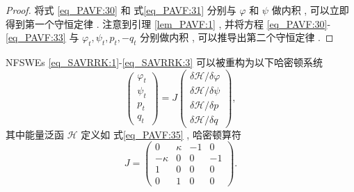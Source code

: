 \begin{proof}
将式 \eqref{eq_PAVF:30} 和 式\eqref{eq_PAVF:31} 分别与 $\varphi$ 和 $\psi$ 做内积 , 可以立即得到第一个守恒定律 . 
注意到引理 \ref{lem_PAVF:1} , 并将方程 \eqref{eq_PAVF:30}-\eqref{eq_PAVF:33} 与 $\varphi_{t} , \psi_{t} , p_{t} , -q_{t}$ 分别做内积 , 可以推导出第二个守恒定律 . 

\end{proof}

\begin{theorem}\label{thm_PAVF:2}
	NFSWEs \eqref{eq_SAVRRK:1}-\eqref{eq_SAVRRK:3} 可以被重构为以下哈密顿系统
\begin{equation}\label{eq_PAVF:37}
	\left(\begin{array}{l}
		\varphi_{t} \\
		\psi_{t} \\
		p_{t} \\
		q_{t}
		\end{array}\right)=J\left(\begin{array}{l}
		\delta \mathcal{H} / \delta \varphi \\
		\delta \mathcal{H} / \delta \psi \\
		\delta \mathcal{H} / \delta p \\
		\delta \mathcal{H} / \delta q
		\end{array}\right) , 
\end{equation}
其中能量泛函 $\mathcal{H}$ 定义如 式\eqref{eq_PAVF:35} , 哈密顿算符
\begin{equation}\label{eq_PAVF:37b}
J=\left(\begin{array}{cccc}
		0 & \kappa & -1 & 0 \\
		-\kappa & 0 & 0 & -1 \\
		1 & 0 & 0 & 0 \\
		0 & 1 & 0 & 0
		\end{array}\right) . 
\end{equation}
\end{theorem}


